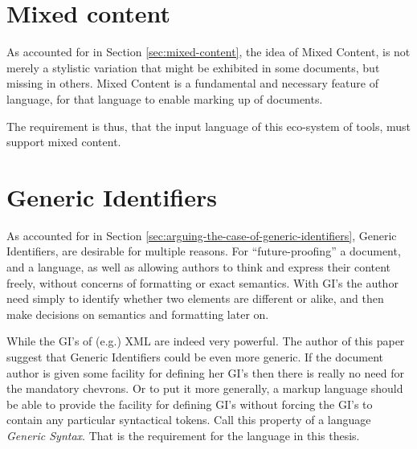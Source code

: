 \documentclass{scrreprt}
\begin{document}
\section{Mixed content}
As accounted for in Section \ref{sec:mixed-content}, the idea of Mixed Content, is not merely a stylistic variation that might be exhibited in some documents, but missing in others. Mixed Content is a fundamental and necessary feature of language, for that language to enable marking up of documents.

The requirement is thus, that the input language of this eco-system of tools, must support mixed content.



\section{Generic Identifiers}
As accounted for in Section \ref{sec:arguing-the-case-of-generic-identifiers}, Generic Identifiers, are desirable for multiple reasons. For ``future-proofing'' a document, and a language, as well as allowing authors to think and express their content freely, without concerns of formatting or exact semantics. With GI's the author need simply to identify whether two elements are different or alike, and then make decisions on semantics and formatting later on.

While the GI's of (e.g.) XML are indeed very powerful. The author of this paper suggest that Generic Identifiers could be even more generic. If the document author is given some facility for defining her GI's then there is really no need for the mandatory chevrons. Or to put it more generally, a markup language should be able to provide the facility for defining GI's without forcing the GI's to contain any particular syntactical tokens. Call this property of a language \emph{Generic Syntax}. That is the requirement for the language in this thesis.





















%
%
%
%
%
%
\end{document}
